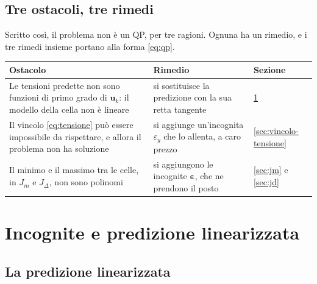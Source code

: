 \documentclass[11pt,a4paper]{article}
\newcommand{\vett}[1]{\boldsymbol{#1}}      %
\begin{document}
\subsection{Tre ostacoli, tre rimedi}\label{sec:ostacoli}

Scritto così, il problema non è un QP, per tre ragioni. Ognuna ha un rimedio,
e i tre rimedi insieme portano alla forma \eqref{eq:qp}.
\begin{center}
\begin{tabular}{p{6.6cm}p{5.2cm}l}
\toprule
Ostacolo & Rimedio & Sezione \\
\midrule
Le tensioni predette non sono funzioni di primo grado di $\vett{u}_k$: il modello della
cella non è lineare &
si sostituisce la predizione con la sua retta tangente &
\ref{sec:incognite} \\[4pt]
Il vincolo \eqref{eq:tensione} può essere impossibile da rispettare, e allora
il problema non ha soluzione &
si aggiunge un'incognita $\varepsilon_y$ che lo allenta, a caro prezzo &
\ref{sec:vincolo-tensione} \\[4pt]
Il minimo e il massimo tra le celle, in $J_m$ e $J_\Delta$, non sono
polinomi &
si aggiungono le incognite $\vett{\varepsilon}$, che ne prendono il posto &
\ref{sec:jm} e \ref{sec:jd} \\
\bottomrule
\end{tabular}
\end{center}

\section{Incognite e predizione linearizzata}\label{sec:incognite}

\subsection{La predizione linearizzata}
\end{document}
